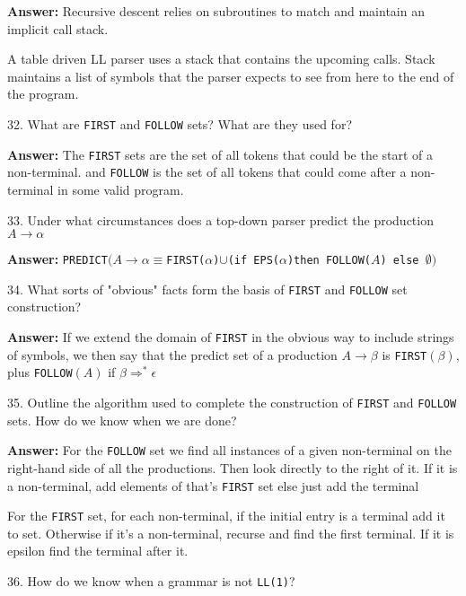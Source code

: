 \vskip 3mm
{\bf Answer:} Recursive descent relies on subroutines to match and maintain an implicit call stack.

\vskip 1mm
A table driven LL parser uses a stack that contains the upcoming calls. Stack maintains a list of symbols that the parser expects to see from here to the end of the program.

\filbreak
\vskip 1cm

32. What are {\tt FIRST} and {\tt FOLLOW} sets? What are they used for?

\vskip 3mm
{\bf Answer:} The {\tt FIRST} sets are the set of all tokens that could be the start of a non-terminal. and {\tt FOLLOW} is the set of all tokens that could come after a non-terminal in some valid program.


\filbreak
\vskip 1cm

33. Under what circumstances does a top-down parser predict the production $A\longrightarrow\alpha$

\vskip 3mm
{\bf Answer:} {\tt PREDICT$(A\to\alpha\equiv$FIRST($\alpha$)$\cup$(if EPS($\alpha$)then FOLLOW($A$) else $\emptyset)$}

\filbreak
\vskip 1cm

34. What sorts of "obvious" facts form the basis of {\tt FIRST} and {\tt FOLLOW} set construction?


\vskip 3mm
{\bf Answer:} If we extend the domain of {\tt FIRST} in the obvious way to include strings of symbols, we then say that the predict set of a production $A\to\beta$ is {\tt FIRST$(\beta)$}, plus {\tt FOLLOW$(A)$} if $\beta\Longrightarrow^*\epsilon$

\filbreak
\vskip 1cm

35. Outline the algorithm used to complete the construction of {\tt FIRST} and {\tt FOLLOW} sets. How do we know when we are done?

\vskip 3mm
{\bf Answer:} For the {\tt FOLLOW} set we find all instances of a given non-terminal on the right-hand side of all the productions. Then look directly to the right of it. If it is a non-terminal, add elements of that's {\tt FIRST} set else just add the terminal

\vskip 1mm
For the {\tt FIRST} set, for each non-terminal, if the initial entry is a terminal add it to set. Otherwise if it's a non-terminal, recurse and find the first terminal. If it is epsilon find the terminal after it.

\filbreak
\vskip 1cm

36. How do we know when a grammar is not {\tt LL(1)}?

